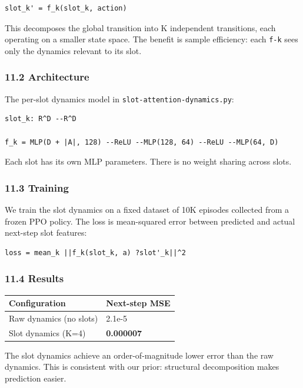 \documentclass[11pt]{article}
\begin{document}
\begin{verbatim}
slot_k' = f_k(slot_k, action)
\end{verbatim}

This decomposes the global transition into K independent transitions, each
operating on a smaller state space. The benefit is sample efficiency: each
\texttt{f-k} sees only the dynamics relevant to its slot.

\subsubsection{11.2 Architecture}

The per-slot dynamics model in \texttt{slot-attention-dynamics.py}:

\begin{verbatim}
slot_k: R^D --R^D

f_k = MLP(D + |A|, 128) --ReLU --MLP(128, 64) --ReLU --MLP(64, D)
\end{verbatim}

Each slot has its own MLP parameters. There is no weight sharing across slots.

\subsubsection{11.3 Training}

We train the slot dynamics on a fixed dataset of 10K episodes collected from a
frozen PPO policy. The loss is mean-squared error between predicted and actual
next-step slot features:

\begin{verbatim}
loss = mean_k ||f_k(slot_k, a) ?slot'_k||^2
\end{verbatim}

\subsubsection{11.4 Results}

\begin{tabular}{ll}
Configuration & Next-step MSE \\
\hline
Raw dynamics (no slots) & 2.1e-5 \\
Slot dynamics (K=4) & \textbf{0.000007} \\
\end{tabular}


The slot dynamics achieve an order-of-magnitude lower error than the raw
dynamics. This is consistent with our prior: structural decomposition makes
prediction easier.
\end{document}
